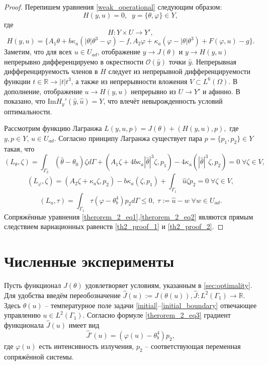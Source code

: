 \documentclass[10pt]{article}
\begin{document}
    \begin{proof}
        Перепишем уравнения \eqref{weak_operational} следующим образом:
        $$H(y,u) = 0,\;\; y = \{\theta,\varphi\} \in Y,$$
        где
        $$ H:Y \times U \to Y', $$
        $$H(y,u) =\{A_1 \theta + b \kappa_a (| \theta | \theta^3 - \varphi ) - f, A_2 \varphi + \kappa_a (\varphi - |\theta|\theta^3) + F(\varphi, u) - g \}.$$
        Заметим, что для всех $u \in U_{ad}$, отображение $y \to J(\theta) $ и $y \to H(y,u)$ непрерывно дифференцируемо в окрестности $\mathcal{O}(\hat{y})$ точки $\hat{y}$. Непрерывная дифференцируемость членов в $H$ следует из непрерывной дифференцируемости функции $t \in \mathbb{R} \to | t | t^3$, а также из непрерывности вложения  $V \subset L^6(\Omega)$.
        В дополнение, отображение $u \to H(y,u)$ непрерывно из $U \to Y'$ и афинно.
        В \cite{cheb_origin} показано, что $\text{Im}H_y'(\hat{y}, \hat{u}) = Y$, что влечёт невырожденность условий оптимальности.

        Рассмотрим функцию Лагранжа
        $L(y,u,p) = J(\theta) + (H(y,u),p),$
        где $y,p \in Y,\, u \in U_{ad}$. Согласно принципу Лагранжа \cite[Гл.2, Теорема 1.5]{theorem_proof_18} существует пара $p = \{p_1,p_2\} \in Y$ такая, что
        \begin{equation}
            \label{th2_proof_1}
            (L_\theta,\zeta) =\int_{\Gamma_2}(\hat\theta -\theta_0) \zeta d\Gamma + (A_1 \zeta + 4b\kappa_a |\hat\theta|^3 \zeta,p_1) - 4\kappa_a(|\hat\theta|^3 \zeta,p_2) = 0 \; \forall \zeta \in V,
        \end{equation}
        \begin{equation}
            \label{th2_proof_2}
            (L_\varphi, \zeta) = (A_2 \zeta + \kappa_a \zeta, p_2) - b \kappa_a(\zeta,p_1) +\int_{\Gamma_1} \hat u \zeta p_2 = 0 \; \forall \zeta \in V,
        \end{equation}
        \begin{equation}
            \label{th2_proof_3}
            (L_u,\tau) = \int_{\Gamma_1} \tau (\varphi - \theta^4_b) p_2 d\Gamma  \leq 0, \; \tau := \hat u - w \; \forall w \in U_{ad}.
        \end{equation}
        Сопряжённые уравнения \eqref{therorem_2_eq1},\eqref{therorem_2_eq2} являются прямым следствием
        вариационных равенств \eqref{th2_proof_1} и \eqref{th2_proof_2}.
    \end{proof}

    \section{Численные эксперименты}
    Пусть функционал $J(\theta)$ удовлетворяет условиям, указанным в \autoref{sec:optimality}. Для удобства введём переобозначение $\hat{J}(u):=J(\theta(u)), \hat{J}:L^2(\Gamma_1) \to \mathbb{R}$. Здесь $\theta(u)$ -- температурное поле задачи  \eqref{initial}--\eqref{initial_boundary} отвечающее управлению $u \in L^2(\Gamma_1)$.
    Согласно формуле \eqref{therorem_2_eq3} градиент функционала $\hat{J}(u)$ \cite{grenkin_13} имеет вид
    $$\hat{J}'(u)= (\varphi(u) -\theta_b^4)p_2,$$
    где $\varphi(u)$ есть интенсивность излучения, $p_2$ -- соответствующая переменная сопряжённой системы.
\end{document}
